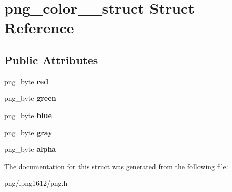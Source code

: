 \hypertarget{structpng__color__8__struct}{\section{png\+\_\+color\+\_\+\_\+struct Struct Reference}
\label{structpng__color__8__struct}
}
\subsection*{Public Attributes}
\begin{DoxyCompactItemize}
\item 
\hypertarget{structpng__color__8__struct_a5cd91bb4b3429256b84e6f28c72778b8}{png\+\_\+byte {\bfseries red}}\label{structpng__color__8__struct_a5cd91bb4b3429256b84e6f28c72778b8}

\item 
\hypertarget{structpng__color__8__struct_a40d053224177df35c037525b39563b05}{png\+\_\+byte {\bfseries green}}\label{structpng__color__8__struct_a40d053224177df35c037525b39563b05}

\item 
\hypertarget{structpng__color__8__struct_a58225d3b6426185d5a40d3c9935db96a}{png\+\_\+byte {\bfseries blue}}\label{structpng__color__8__struct_a58225d3b6426185d5a40d3c9935db96a}

\item 
\hypertarget{structpng__color__8__struct_a574edc173d956cca144927262e88653e}{png\+\_\+byte {\bfseries gray}}\label{structpng__color__8__struct_a574edc173d956cca144927262e88653e}

\item 
\hypertarget{structpng__color__8__struct_af1c7203aefe12bd35dc9a4cdd58e7a4b}{png\+\_\+byte {\bfseries alpha}}\label{structpng__color__8__struct_af1c7203aefe12bd35dc9a4cdd58e7a4b}

\end{DoxyCompactItemize}


The documentation for this struct was generated from the following file\+:\begin{DoxyCompactItemize}
\item 
png/lpng1612/png.\+h\end{DoxyCompactItemize}
